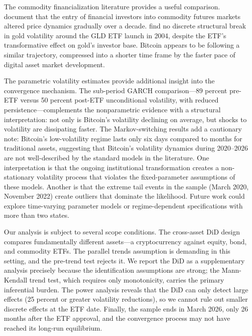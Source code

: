 \documentclass[12pt,a4paper]{article}
\begin{document}
The commodity financialization literature provides a useful comparison.
\citet{cheng2014financialization} document that the entry of financial
investors into commodity futures markets altered price dynamics gradually
over a decade. \citet{baur2010gold} find no discrete structural break in
gold volatility around the GLD ETF launch in 2004, despite the ETF's
transformative effect on gold's investor base. Bitcoin appears to be
following a similar trajectory, compressed into a shorter time frame
by the faster pace of digital asset market development.

The parametric volatility estimates provide additional insight into the
convergence mechanism. The sub-period GARCH comparison---89 percent pre-ETF
versus 50 percent post-ETF unconditional volatility, with reduced
persistence---complements the nonparametric evidence with a structural
interpretation: not only is Bitcoin's volatility declining on average, but
shocks to volatility are dissipating faster. The Markov-switching results
add a cautionary note: Bitcoin's low-volatility regime lasts only six days
compared to months for traditional assets, suggesting that
Bitcoin's volatility dynamics during 2020--2026 are not well-described by
the standard models in the literature. One interpretation is that the
ongoing institutional transformation creates a non-stationary volatility
process that violates the fixed-parameter assumptions of these models.
Another is that the extreme tail events in the sample (March 2020, November
2022) create outliers that dominate the likelihood. Future work could
explore time-varying parameter models or regime-dependent specifications
with more than two states.

Our analysis is subject to several scope conditions. The cross-asset DiD
design compares fundamentally different assets---a cryptocurrency against
equity, bond, and commodity ETFs. The parallel trends assumption is
demanding in this setting, and the pre-trend test rejects it. We report the
DiD as a supplementary analysis precisely because the identification
assumptions are strong; the Mann-Kendall trend test, which requires only
monotonicity, carries the primary inferential burden. The power analysis
reveals that the DiD can only detect large effects (25 percent or greater
volatility reductions), so we cannot rule out smaller discrete effects at
the ETF date. Finally, the sample ends in March 2026, only 26 months after
the ETF approval, and the convergence process may not have reached its
long-run equilibrium.
\end{document}
